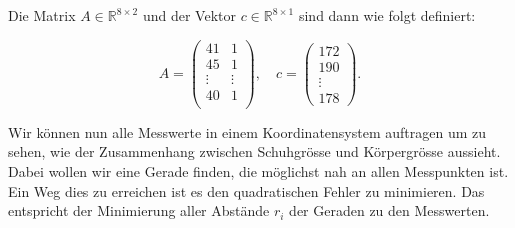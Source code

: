 \vspace{1\baselineskip}

Die Matrix \( A \in \mathbb{R}^{8 \times 2} \) und der Vektor \( c \in \mathbb{R}^{8 \times 1} \) sind dann wie folgt definiert:

\begin{equation*}
    A = \begin{pmatrix}
        41 & 1 \\
        45 & 1 \\
        \vdots & \vdots \\
        40 & 1 \\
    \end{pmatrix}, \quad
    c = \begin{pmatrix}
        172 \\ 190 \\ \vdots \\ 178
    \end{pmatrix}.
\end{equation*}


\vspace{1\baselineskip}

Wir können nun alle Messwerte in einem Koordinatensystem auftragen um zu sehen, wie der Zusammenhang zwischen Schuhgrösse und Körpergrösse aussieht. Dabei wollen wir eine Gerade finden, die möglichst nah an allen Messpunkten ist. Ein Weg dies zu erreichen ist es den quadratischen Fehler zu minimieren. Das entspricht der Minimierung aller Abstände \( r_i \) der Geraden zu den Messwerten. 

\vspace{1\baselineskip}

